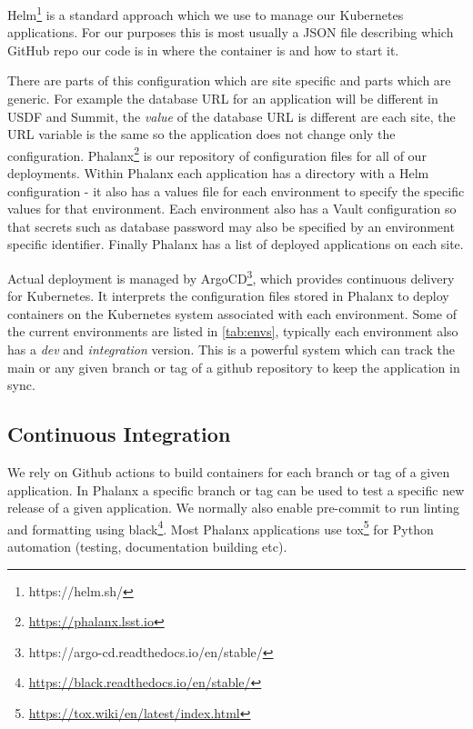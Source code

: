 Helm\footnote{https://helm.sh/} is a standard approach which we use to manage our Kubernetes applications.
For our purposes this is most usually a JSON file describing which GitHub repo our code is in where the container is and how to start it.

There are parts of this configuration which are site specific and parts which are generic.
For example the database URL for an application will be different in USDF and Summit, the \emph{value} of the database URL is different are each site, the URL variable is the same so the application does not change only the configuration.
Phalanx\footnote{\url{https://phalanx.lsst.io}} is our repository of configuration files for all of our deployments.
Within Phalanx each application has a directory with a Helm configuration - it also has a values file for each environment to specify the specific values for that environment.
Each environment also has a Vault configuration so that secrets such as database password may also be specified by an environment specific identifier.
Finally Phalanx has a list of deployed applications on each site.

Actual deployment is managed by ArgoCD\footnote{https://argo-cd.readthedocs.io/en/stable/}, which provides continuous delivery for Kubernetes.
It interprets the configuration files stored in Phalanx to deploy containers on the Kubernetes system associated with each environment.
Some of the current environments are listed in \autoref{tab:envs}, typically each environment also has a \emph{dev} and \emph{integration} version.
This is a powerful system which can track the main or any given branch or tag of a github repository to keep the application in sync.


\subsection{Continuous Integration}
We rely on Github actions to build containers for each branch or tag of a given application.
In Phalanx a specific branch or tag can be used to test a specific new release of a given application.
We normally also enable pre-commit to run linting and formatting using black\footnote{\url{https://black.readthedocs.io/en/stable/}}.
Most Phalanx applications use tox\footnote{\url{https://tox.wiki/en/latest/index.html}} for Python automation (testing, documentation building etc).

